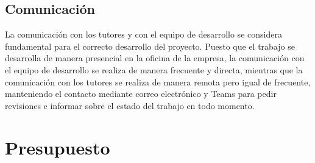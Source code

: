 \subsection{Comunicación}\label{subsec:comunicación}
La comunicación con los tutores y con el equipo de desarrollo se considera fundamental para el
correcto desarrollo del proyecto. Puesto que el trabajo se desarrolla de manera presencial en
la oficina de la empresa, la comunicación con el equipo de desarrollo se realiza de manera
frecuente y directa, mientras que la comunicación con los tutores se realiza de manera remota
pero igual de frecuente, manteniendo el contacto mediante correo electrónico y Teams para
pedir revisiones e informar sobre el estado del trabajo en todo momento.
\newpage{}
\section{Presupuesto}\label{sec:presupuesto}
